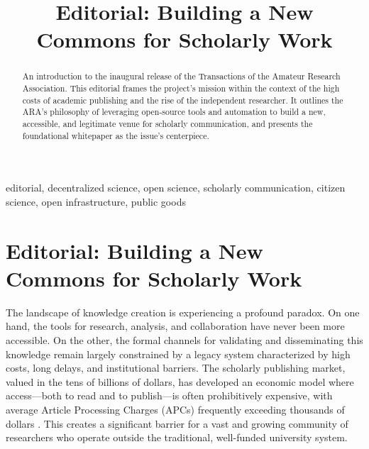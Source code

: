 \documentclass[conference, compsoc, 11pt]{IEEEtran}
\title{Editorial: Building a New Commons for Scholarly Work}
\author{
    \IEEEauthorblockN{Ivan Anishchuk}
    \IEEEauthorblockA{
        Editor-in-Chief, Amateur Research Association\\
        ORCID \orcidicon{0000-0000-0000-0000}: 0000-0000-0000-0000 %
    }
}
\begin{document}
\IEEEoverridecommandlockouts
{}

\maketitle

\IEEEpubidadjcol

\begin{abstract}
An introduction to the inaugural release of the Transactions of the Amateur Research Association. This editorial frames the project's mission within the context of the high costs of academic publishing and the rise of the independent researcher. It outlines the ARA's philosophy of leveraging open-source tools and automation to build a new, accessible, and legitimate venue for scholarly communication, and presents the foundational whitepaper as the issue's centerpiece.
\end{abstract}

\begin{IEEEkeywords}
editorial, decentralized science, open science, scholarly communication, citizen science, open infrastructure, public goods
\end{IEEEkeywords}

\section*{Editorial: Building a New Commons for Scholarly Work}

The landscape of knowledge creation is experiencing a profound paradox. On one hand, the tools for research, analysis, and collaboration have never been more accessible. On the other, the formal channels for validating and disseminating this knowledge remain largely constrained by a legacy system characterized by high costs, long delays, and institutional barriers. The scholarly publishing market, valued in the tens of billions of dollars, has developed an economic model where access—both to read and to publish—is often prohibitively expensive, with average Article Processing Charges (APCs) frequently exceeding thousands of dollars \cite{solomon2016}. This creates a significant barrier for a vast and growing community of researchers who operate outside the traditional, well-funded university system.
\end{document}
